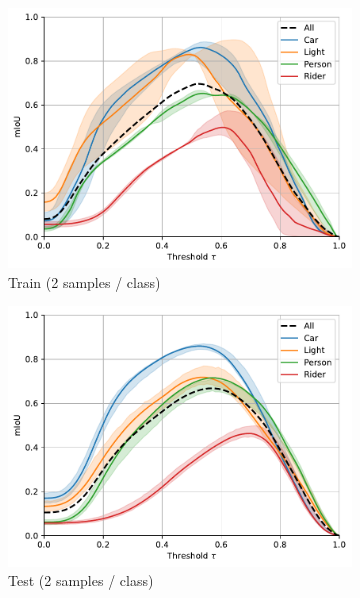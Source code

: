 \begin{figure}
  \begin{subfigure}{0.49\columnwidth}
   \includegraphics[width=\columnwidth]{img/4-experiments/heatmap-optimized-iou-2-300-train.pdf}
   \caption{Train (2 samples / class)}
   \label{fig:miou-optimized-ious-train-2}
  \end{subfigure}
  \begin{subfigure}{0.49\columnwidth}
   \includegraphics[width=\columnwidth]{img/4-experiments/heatmap-optimized-iou-2-300-test.pdf}
   \caption{Test (2 samples / class)}
   \label{fig:miou-optimized-ious-test-2}
  \end{subfigure}
  \begin{subfigure}{0.49\columnwidth}

\end{subfigure}
\end{figure}
